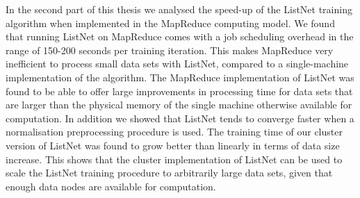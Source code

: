 In the second part of this thesis we analysed the speed-up of the ListNet training algorithm when implemented in the MapReduce computing model. We found that running ListNet on MapReduce comes with a job scheduling overhead in the range of 150-200 seconds per training iteration. This makes MapReduce very inefficient to process small data sets with ListNet, compared to a single-machine implementation of the algorithm. The MapReduce implementation of ListNet was found to be able to offer large improvements in processing time for data sets that are larger than the physical memory of the single machine otherwise available for computation. In addition we showed that ListNet tends to converge faster when a normalisation preprocessing procedure is used. The training time of our cluster version of ListNet was found to grow better than linearly in terms of data size increase. This shows that the cluster implementation of ListNet can be used to scale the ListNet training procedure to arbitrarily large data sets, given that enough data nodes are available for computation.



\endgroup			

\vfill